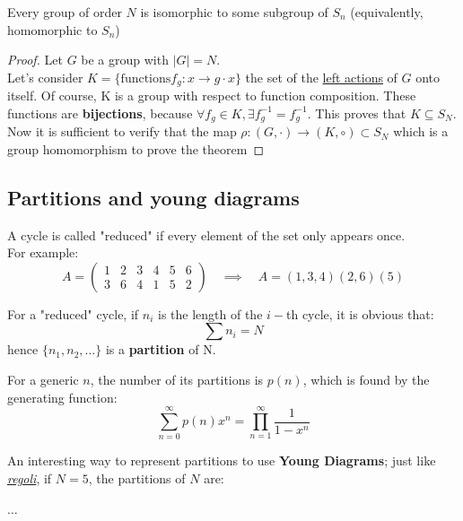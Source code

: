 \begin{theorem}
  Every group of order $N$ is isomorphic to some subgroup of $S_n$ (equivalently, homomorphic to $S_n$)
\end{theorem}
\begin{proof}
  Let $G$ be a group with $|G| = N$.
  \\
  Let's consider $K = \{  \text{functions} f_g : x \to g \cdot x  \}$ the set of the \href{https://en.wikipedia.org/wiki/Group_action#Left_group_action}{left actions} of $G$ onto itself. Of course, K is a group with respect to function composition. These functions are \textbf{bijections}, because $\forall f_g \in K, \exists f_g^{-1} = f_g^{-1}$.
  This proves that $K \subseteq S_N$. \\
  Now it is sufficient to verify that the map $\rho : (G, \cdot) \to (K, \circ) \subset S_N$ which is a group homomorphism to prove the theorem
\end{proof}


\subsection{Partitions and young diagrams}
\begin{definition}
  A cycle is called "reduced" if every element of the set only appears once.\\
  For example:
  \[
    A = \begin{pmatrix}
      1&2&3&4&5&6 \\ 
      3&6&4&1&5&2
    \end{pmatrix}
    \quad \implies \quad
    A = (1,3,4)(2,6)(5)
  \]

\end{definition}

\begin{claim}
  For a "reduced" cycle, if $n_i$ is the length of the $i-$th cycle, it is obvious that:
  \[
    \sum n_i = N
  \]
  hence $\{n_1,n_2,\dots \}$ is a \textbf{partition} of N.
\end{claim}
For a generic $n$, the number of its partitions is $p(n)$, which is found by the generating function:
\[
  \sum^{\infty}_{n=0} p(n)x^n =  \prod_{n=1}^{\infty} \frac{1}{1-x^n}
\]

An interesting way to represent partitions to use \textbf{Young Diagrams}; just like \href{https://en.wikipedia.org/wiki/Cuisenaire_rods}{\textit{regoli}}, if $N =5$, the partitions of $N$ are:
\begin{center}
   \qquad {} \qquad  {} \qquad {} \quad $\dots$
\end{center}

